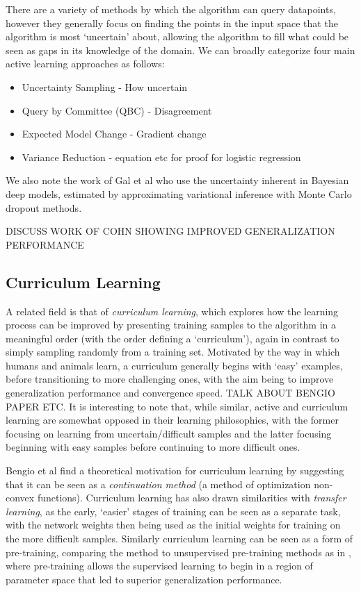 \documentclass[a4paper,11pt]{article}
\begin{document}
There are a variety of methods by which the algorithm can query datapoints, however they generally focus on finding the points in the input space that the algorithm is most `uncertain' about, allowing the algorithm to fill what could be seen as gaps in its knowledge of the domain. We can broadly categorize four main active learning approaches as follows:
\begin{itemize}
\item Uncertainty Sampling - How uncertain
\item Query by Committee (QBC) - Disagreement
\item Expected Model Change - Gradient change
\item Variance Reduction - equation etc for proof for logistic regression
\end{itemize}
We also note the work of Gal et al \cite{Gal 2017} who use the uncertainty inherent in Bayesian deep models, estimated by approximating variational inference with Monte Carlo dropout methods.

DISCUSS WORK OF COHN SHOWING IMPROVED GENERALIZATION PERFORMANCE

\subsection*{Curriculum Learning}
A related field is that of \textit{curriculum learning}, which explores how the learning process can be improved by presenting training samples to the algorithm in a meaningful order (with the order defining a `curriculum'), again in contrast to simply sampling randomly from a training set. Motivated by the way in which humans and animals learn, a curriculum generally begins with `easy' examples, before transitioning to more challenging ones, with the aim being to improve generalization performance and convergence speed. TALK ABOUT BENGIO PAPER ETC. It is interesting to note that, while similar, active and curriculum learning are somewhat opposed in their learning philosophies, with the former focusing on learning from uncertain/difficult samples and the latter focusing beginning with easy samples before continuing to more difficult ones. 

Bengio et al \cite{Bengio 09} find a theoretical motivation for curriculum learning by suggesting that it can be seen as a \textit{continuation method} (a method of optimization non-convex functions). Curriculum learning has also drawn similarities with \textit{transfer learning}, as the early, `easier' stages of training can be seen as a separate task, with the network weights then being used as the initial weights for training on the more difficult samples. Similarly curriculum learning can be seen as a form of pre-training, comparing the method to unsupervised pre-training methods as in \cite{Erhan 09}, where pre-training allows the supervised learning to begin in a region of parameter space that led to superior generalization performance. 
\end{document}
